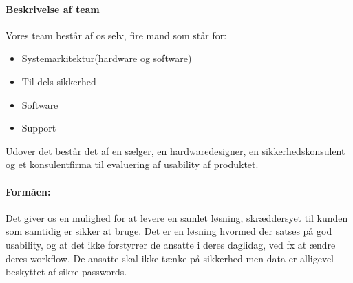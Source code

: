 \paragraph{Beskrivelse af team}
Vores team består af os selv, fire mand som står for:
\begin{itemize}
\item Systemarkitektur(hardware og software)
\item Til dels sikkerhed
\item Software
\item Support
\end{itemize}
Udover det består det af en sælger, en hardwaredesigner, en sikkerhedskonsulent og et konsulentfirma til evaluering af usability af produktet.

\paragraph{Formåen:}
Det giver os en mulighed for at levere en samlet løsning, skræddersyet til kunden som samtidig er sikker at bruge.
Det er en løsning hvormed der satses på god usability, og at det ikke forstyrrer de ansatte i deres daglidag, ved fx at ændre deres workflow.
De ansatte skal ikke tænke på sikkerhed men data er alligevel beskyttet af sikre passwords.
